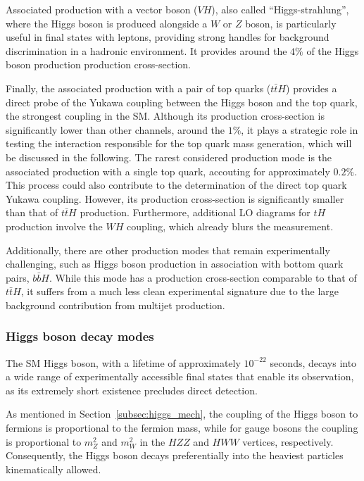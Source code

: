 Associated production with a vector boson ($VH$), also called ``Higgs-strahlung'', where the Higgs boson is produced alongside a $W$ or $Z$ boson, is particularly useful in final states with leptons, providing strong handles for background discrimination in a hadronic environment. It provides around the $4\%$ of the Higgs boson production production cross-section.

Finally, the associated production with a pair of top quarks ($t\bar{t}H$) provides a direct probe of the Yukawa coupling between the Higgs boson and the top quark, the strongest coupling in the SM. Although its production cross-section is significantly lower than other channels, around the $1\%$, it plays a strategic role in testing the interaction responsible for the top quark mass generation, which will be discussed in the following.
The rarest considered production mode is the associated production with a single top quark, accouting for approximately $0.2\%$. This process could also contribute to the determination of the direct top quark Yukawa coupling. However, its production cross-section is significantly smaller than that of \( t\bar{t}H \) production. Furthermore, additional LO diagrams for $tH$ production involve the $WH$ coupling, which already blurs the measurement.

Additionally, there are other production modes that remain experimentally challenging, such as Higgs boson production in association with bottom quark pairs, \( b\bar{b}H \). While this mode has a production cross-section comparable to that of \( t\bar{t}H \), it suffers from a much less clean experimental signature due to the large background contribution from multijet production.

\subsubsection*{Higgs boson decay modes}
\label{sec:higgs_decay}

The SM Higgs boson, with a lifetime of approximately \(10^{-22}\) seconds, decays into a wide range of experimentally accessible final states that enable its observation, as its extremely short existence precludes direct detection.

As mentioned in Section~\ref{subsec:higgs_mech}, the coupling of the Higgs boson to fermions is proportional to the fermion mass, while for gauge bosons the coupling is proportional to \(m_Z^2\) and \(m_W^2\) in the \(HZZ\) and \(HWW\) vertices, respectively. Consequently, the Higgs boson decays preferentially into the heaviest particles kinematically allowed.

